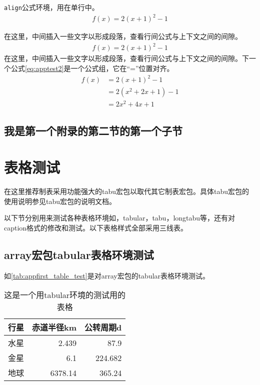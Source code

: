 \texttt{align}公式环境，用在单行中。
\begin{align}\label{eq:apptest1}
	f(x) = 2(x + 1)^{2} - 1
\end{align}

在这里，中间插入一些文字以形成段落，查看行间公式与上下文之间的间隙。
\begin{align*}
	f(x) = 2(x + 1)^{2} - 1
\end{align*}
在这里，中间插入一些文字以形成段落，查看行间公式与上下文之间的间隙。下一个公式\eqref{eq:apptest2}是一个公式组，它在“=”位置对齐。
\begin{align}\label{eq:apptest2}
	f(x) & = 2(x + 1)^{2} - 1\\
		 & = 2(x^{2} + 2x +1)-1\\
		 & = 2x^{2} + 4x + 1
\end{align}

\subsection{我是第一个附录的第二节的第一个子节}

\section{表格测试}
在这里推荐制表采用功能强大的tabu宏包以取代其它制表宏包。具体tabu宏包的使用说明参见tabu宏包的说明文档。

以下节分别用来测试各种表格环境如，tabular，tabu，longtabu等，还有对caption格式的修改和测试。以下表格样式全部采用三线表。

\subsection{array宏包tabular表格环境测试}
如\autoref{tab:appfirst_table_test}是对array宏包的tabular表格环境测试。
\begin{table}[htbp]
	\centering
	\caption{这是一个用tabular环境的测试用的表格}\label{tab:appfirst_table_test}
    \begin{tabular}{lrr}
    \toprule
    \textbf{行星}     & \textbf{赤道半径}km & \textbf{公转周期}d \\
    \midrule
    水星     & 2.439  & 87.9 \\
    金星     & 6.1    & 224.682 \\
    地球     & 6378.14 & 365.24 \\
    \bottomrule
    \end{tabular}%
\end{table}

